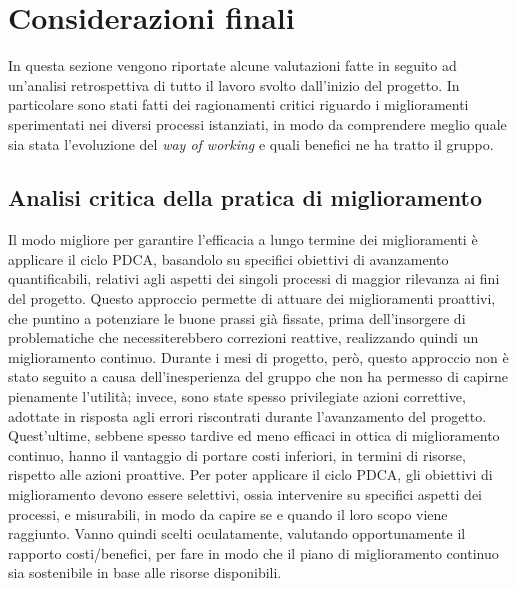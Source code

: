 
\section{Considerazioni finali}
	In questa sezione vengono riportate alcune valutazioni fatte in seguito ad un'analisi retrospettiva di tutto il lavoro svolto dall'inizio del progetto. In particolare sono stati fatti dei ragionamenti critici riguardo i miglioramenti sperimentati nei diversi processi istanziati, in modo da comprendere meglio quale sia stata l'evoluzione del \textit{way of working} e quali benefici ne ha tratto il gruppo.
	
	\subsection{Analisi critica della pratica di miglioramento}
		Il modo migliore per garantire l'efficacia a lungo termine dei miglioramenti è applicare il ciclo PDCA, basandolo su specifici obiettivi di avanzamento quantificabili, relativi agli aspetti dei singoli processi di maggior rilevanza ai fini del progetto. Questo approccio permette di attuare dei miglioramenti proattivi, che puntino a potenziare le buone prassi già fissate, prima dell'insorgere di problematiche che necessiterebbero correzioni reattive, realizzando quindi un miglioramento continuo.
		\newline
		Durante i mesi di progetto, però, questo approccio non è stato seguito a causa dell'inesperienza del gruppo che non ha permesso di capirne pienamente l'utilità; invece, sono state spesso privilegiate azioni correttive, adottate in risposta agli errori riscontrati durante l'avanzamento del progetto. Quest'ultime, sebbene spesso tardive ed meno efficaci in ottica di miglioramento continuo, hanno il vantaggio di portare costi inferiori, in termini di risorse, rispetto alle azioni proattive.
		\newline
		Per poter applicare il ciclo PDCA, gli obiettivi di miglioramento devono essere selettivi, ossia intervenire su specifici aspetti dei processi, e misurabili, in modo da capire se e quando il loro scopo viene raggiunto. Vanno quindi scelti oculatamente, valutando opportunamente il rapporto costi/benefici, per fare in modo che il piano di miglioramento continuo sia sostenibile in base alle risorse disponibili.
	

